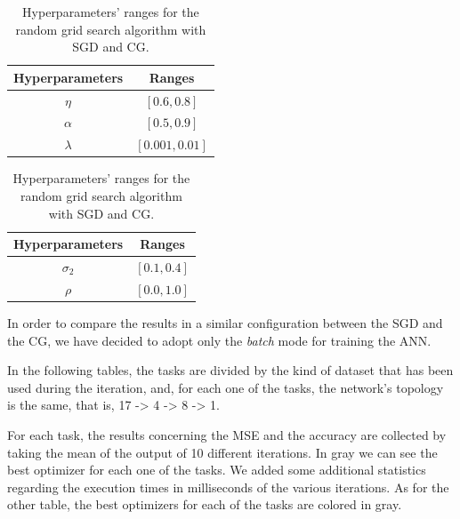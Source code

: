         \begin{table}[H]
          \centering
          \caption{Hyperparameters' ranges for the random grid search algorithm with SGD and CG.}
          \begin{minipage}{.4\textwidth}
              \centering
              \begin{tabular}{| c | c |}
                    \hline
                    Hyperparameters & Ranges\\
                    \hline
                    $\eta$ & $\left [0.6, 0.8 \right ]$ \\
                    \hline
                    $\alpha$ & $[0.5, 0.9]$ \\
                    \hline
                    $\lambda$ & $[0.001, 0.01]$ \\
                    \hline
              \end{tabular}
          \end{minipage}
          \begin{minipage}{.4\textwidth}
              \centering
              \begin{tabular}{| c | c |}
                    \hline
                    Hyperparameters & Ranges\\
                    \hline
                    $\sigma_2$ & $\left [0.1, 0.4 \right ]$ \\
                    \hline
                    $\rho$ & $[0.0, 1.0]$ \\
                    \hline
              \end{tabular}
            \end{minipage}
            \label{tab:hyper_monk}
        \end{table}

        In order to compare the
        results in a similar configuration between the SGD and the CG, we have decided to adopt only the \textit{batch} mode for training the ANN. 

        In the following tables, the tasks are divided by the kind of dataset that has been used during the iteration, and, for
        each one of the tasks, the network's topology is the same, that is, 17 -> 4 -> 8 -> 1.

        For each
        task, the results concerning the MSE and the accuracy are collected by taking the mean of the
        output of 10 different iterations. In gray we can see the best optimizer for each one of the
        tasks. We added some additional statistics
        regarding the execution times in milliseconds of the various iterations. As for the other table, the best
        optimizers for each of the tasks are colored in gray.

